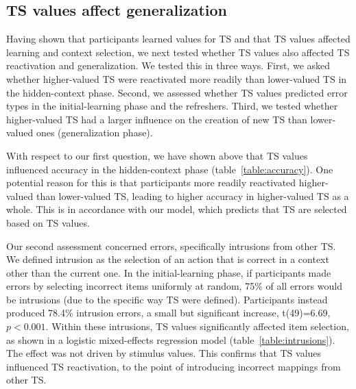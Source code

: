 \documentclass[10pt, letterpaper]{article}
\begin{document}
\subsection{TS values affect generalization}

Having shown that participants learned values for TS and that TS values affected learning and context selection, we next tested whether TS values also affected TS reactivation and generalization. We tested this in three ways. First, we asked whether higher-valued TS were reactivated more readily than lower-valued TS in the hidden-context phase. Second, we assessed whether TS values predicted error types in the initial-learning phase and the refreshers. Third, we tested whether higher-valued TS had a larger influence on the creation of new TS than lower-valued ones (generalization phase).

With respect to our first question, we have shown above that TS values influenced accuracy in the hidden-context phase (table~\ref{table:accuracy}). One potential reason for this is that participants more readily reactivated higher-valued than lower-valued TS, leading to higher accuracy in higher-valued TS as a whole. This is in accordance with our model, which predicts that TS are selected based on TS values.

Our second assessment concerned errors, specifically intrusions from other TS. We defined intrusion as the selection of an action that is correct in a context other than the current one. In the initial-learning phase, if participants made errors by selecting incorrect items uniformly at random, 75\% of all errors would be intrusions (due to the specific way TS were defined). Participants instead produced 78.4\% intrusion errors, a small but significant increase, t(49)=6.69, $p<0.001$. Within these intrusions, TS values significantly affected item selection, as shown in a logistic mixed-effects regression model (table~\ref{table:intrusions}). The effect was not driven by stimulus values. This confirms that TS values influenced TS reactivation, to the point of introducing incorrect mappings from other TS.
\end{document}
